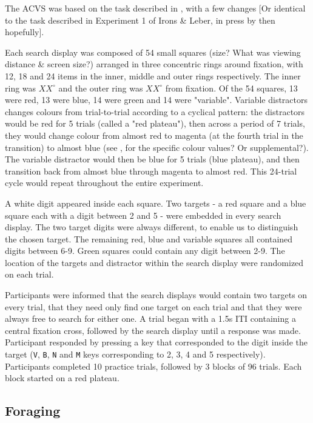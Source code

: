 \documentclass[a4paper, oneside, 11pt, onecolumn]{article}
\begin{document}
The ACVS was based on the task described in \cite{irons-leber2016}, with a few changes [Or identical to the task described in Experiment 1 of Irons \& Leber, in press by then hopefully].

Each search display was composed of 54 small squares (size? What was viewing distance \& screen size?) arranged in three concentric rings around fixation, with 12, 18 and 24 items in the inner, middle and outer rings respectively. The inner ring was $XX^{\circ}$ and the outer ring was $XX^{\circ}$ from fixation. Of the 54 squares, 13 were red, 13 were blue, 14 were green and 14 were "variable". Variable distractors changes colours from trial-to-trial according to a cyclical pattern: the distractors would be red for 5 trials (called a "red plateau"), then across a period of 7 trials, they would change colour from almost red to magenta (at the fourth trial in the transition) to almost blue (see \cite{irons-leber2017}, for the specific colour values? Or supplemental?). The variable distractor would then be blue for 5 trials (blue plateau), and then transition back from almost blue through magenta to almost red. This 24-trial cycle would repeat throughout the entire experiment. 

A white digit appeared inside each square. Two targets - a red square and a blue square each with a digit between 2 and 5 - were embedded in every search display. The two target digits were always different, to enable us to distinguish the chosen target. The remaining red, blue and variable squares all contained digits between 6-9. Green squares could contain any digit between 2-9. The location of the targets and distractor within the search display were randomized on each trial.

Participants were informed that the search displays would contain two targets on every trial, that they need only find one target on each trial and that they were always free to search for either one. A trial began with a 1.5s ITI containing a central fixation cross, followed by the search display until a response was made. Participant responded by pressing a key that corresponded to the digit inside the target (\texttt{V}, \texttt{B}, \texttt{N} and \texttt{M} keys corresponding to 2, 3, 4 and 5 respectively). Participants completed 10 practice trials, followed by 3 blocks of 96 trials. Each block started on a red plateau.  


\subsection{Foraging}
\end{document}
